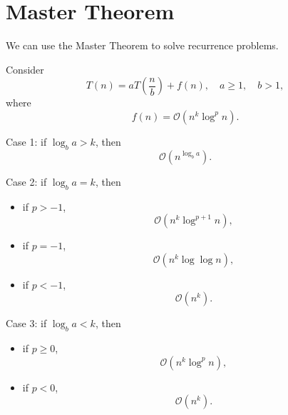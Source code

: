 \chapter{Master Theorem}\label{mastertheorem}

We can use the Master Theorem to solve recurrence problems. 

Consider 
\[
	T(n) = aT\left(\dfrac{n}{b}\right) + f(n),\quad a \geq 1,\quad b > 1,
\]
where 
\[
	f(n) = \mathcal{O} (n^k \log^p n).
\]

Case 1: if \(\log_b a > k\), then 
\[
	\mathcal{O} (n^{\log_b a}).
\]

Case 2: if \(\log_b a = k\), then 
\begin{itemize}
	\item if \(p > -1\),
	\[
		\mathcal{O} (n^k \log^{p + 1} n),
	\]
	\item if \(p = -1\),
	\[
		\mathcal{O} (n^k \log \log n),
	\]
	\item if \(p < -1\),
	\[
		\mathcal{O} (n^k).
	\]
\end{itemize}

Case 3: if \(\log_b a < k\), then 
\begin{itemize}
	\item if \(p \geq 0\),
	\[
		\mathcal{O} (n^k \log^p n),
	\]
	\item if \(p < 0\),
	\[
		\mathcal{O} (n^k).
	\]
\end{itemize}
